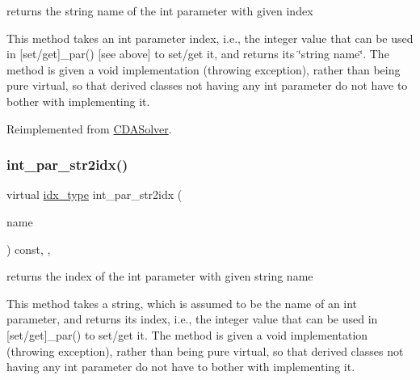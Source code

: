 returns the string name of the int parameter with given index 

This method takes an int parameter index, i.\+e., the integer value that can be used in \mbox{[}set/get\mbox{]}\+\_\+par() \mbox{[}see above\mbox{]} to set/get it, and returns its \char`\"{}string name\char`\"{}. The method is given a void implementation (throwing exception), rather than being pure virtual, so that derived classes not having any int parameter do not have to bother with implementing it. 

Reimplemented from \mbox{\hyperlink{class_s_m_spp__di__unipi__it_1_1_c_d_a_solver_a61e973f39747f63b8f56d97cc62e32ce}{C\+D\+A\+Solver}}.

\mbox{\label{class_s_m_spp__di__unipi__it_1_1_m_c_f_solver_ae281b6699b0707a5cdc1e82b76d26c09}} 
\subsubsection{\texorpdfstring{int\+\_\+par\+\_\+str2idx()}{int\_par\_str2idx()}}
{\footnotesize\ttfamily virtual \mbox{\hyperlink{class_s_m_spp__di__unipi__it_1_1_thin_compute_interface_aa3d710629ad8c434286726ad810c3b47}{idx\+\_\+type}} int\+\_\+par\+\_\+str2idx (\begin{DoxyParamCaption}\item[{const std\+::string \&}]{name }\end{DoxyParamCaption}) const\hspace{0.3cm}{\ttfamily [inline]}, {\ttfamily [override]}, {\ttfamily [virtual]}}



returns the index of the int parameter with given string name 

This method takes a string, which is assumed to be the name of an int parameter, and returns its index, i.\+e., the integer value that can be used in \mbox{[}set/get\mbox{]}\+\_\+par() to set/get it. The method is given a void implementation (throwing exception), rather than being pure virtual, so that derived classes not having any int parameter do not have to bother with implementing it. 

